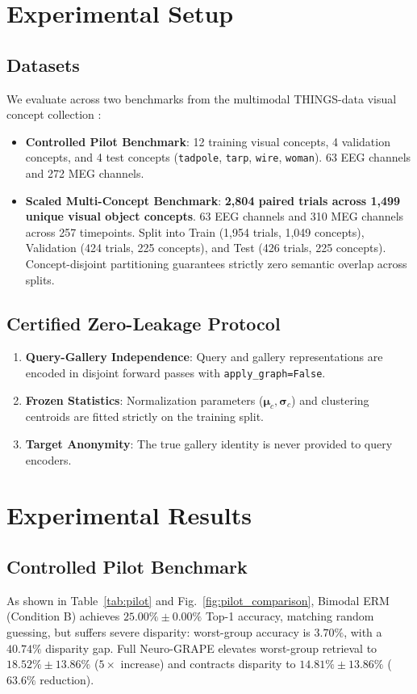 \documentclass[conference]{IEEEtran}
\begin{document}
\section{Experimental Setup}

\subsection{Datasets}
We evaluate across two benchmarks from the multimodal THINGS-data visual concept collection \cite{hebart2023thingsdata}:
\begin{itemize}
    \item \textbf{Controlled Pilot Benchmark}: 12 training visual concepts, 4 validation concepts, and 4 test concepts (\texttt{tadpole}, \texttt{tarp}, \texttt{wire}, \texttt{woman}). 63 EEG channels and 272 MEG channels.
    \item \textbf{Scaled Multi-Concept Benchmark}: \textbf{2,804 paired trials across 1,499 unique visual object concepts}. 63 EEG channels and 310 MEG channels across 257 timepoints. Split into Train (1,954 trials, 1,049 concepts), Validation (424 trials, 225 concepts), and Test (426 trials, 225 concepts). Concept-disjoint partitioning guarantees strictly zero semantic overlap across splits.
\end{itemize}

\subsection{Certified Zero-Leakage Protocol}
\begin{enumerate}
    \item \textbf{Query-Gallery Independence}: Query and gallery representations are encoded in disjoint forward passes with \texttt{apply\_graph=False}.
    \item \textbf{Frozen Statistics}: Normalization parameters ($\boldsymbol{\mu}_c, \boldsymbol{\sigma}_c$) and clustering centroids are fitted strictly on the training split.
    \item \textbf{Target Anonymity}: The true gallery identity is never provided to query encoders.
\end{enumerate}

\section{Experimental Results}

\subsection{Controlled Pilot Benchmark}
As shown in Table~\ref{tab:pilot} and Fig.~\ref{fig:pilot_comparison}, Bimodal ERM (Condition B) achieves $25.00\% \pm 0.00\%$ Top-1 accuracy, matching random guessing, but suffers severe disparity: worst-group accuracy is $3.70\%$, with a $40.74\%$ disparity gap. Full Neuro-GRAPE elevates worst-group retrieval to $\mathbf{18.52\% \pm 13.86\%}$ ($5\times$ increase) and contracts disparity to $\mathbf{14.81\% \pm 13.86\%}$ ($63.6\%$ reduction). 
\end{document}
